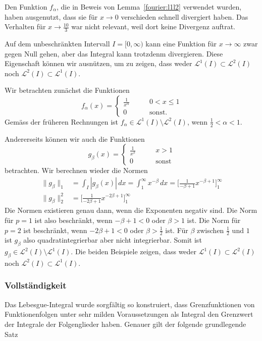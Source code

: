 \begin{beispiel}
Den Funktion $f_\alpha$, die in Beweis von Lemma~\ref{fourier:l1l2}
verwendet wurden, haben ausgenutzt, dass sie für $x\to 0$ verschieden 
schnell divergiert haben.
Das Verhalten für $x\to \frac{10}3$ war nicht relevant, weil dort keine
Divergenz auftrat.

Auf dem unbeschränkten Intervall $I=[0,\infty)$ kann eine Funktion 
für $x\to\infty$ zwar gegen Null gehen, aber das Integral kann trotzdenm
divergieren.
Diese Eigenschaft können wir ausnützen, um zu zeigen, dass weder
$\mathcal{L}^1(I)\subset\mathcal{L}^2(I)$
noch
$\mathcal{L}^2(I)\subset\mathcal{L}^1(I)$.

Wir betrachten zunächst die Funktionen
\[
f_\alpha(x) = \begin{cases}
\displaystyle\frac1{x^\alpha}&\qquad0<x\le 1\\
0&\qquad\text{sonst.}
\end{cases}
\]
Gemäss der früheren Rechnungen ist
$f_\alpha\in\mathcal{L}^1(I)\setminus\mathcal{L}^2(I)$,
wenn $\frac12<\alpha<1$.

Andererseits können wir auch die Funktionen
\[
g_\beta(x)
=
\begin{cases}
\displaystyle\frac1{x^\beta}&\qquad x>1\\
0&\qquad\text{sonst}
\end{cases}
\]
betrachten.
Wir berechnen wieder die Normen
\begin{align*}
\| g_\beta\|_1
&=
\int_I|g_\beta(x)|\,dx
=
\int_1^\infty x^{-\beta}\,dx
=
\biggl[
\frac1{-\beta+1}x^{-\beta+1}
\biggr]_1^\infty
\\
\|g_\beta\|_2^2
&=
\biggl[
\frac1{-2\beta+1}x^{-2\beta+1}
\biggr]_1^\infty
\end{align*}
Die Normen existieren genau dann, wenn die Exponenten negativ sind.
Die Norm für $p=1$ ist also beschränkt, wenn $-\beta+1<0$ oder $\beta > 1$
ist.
Die Norm für $p=2$ ist beschränkt, wenn $-2\beta+1<0$ oder $\beta > \frac12$
ist.
Für $\beta$ zwischen $\frac12$ und $1$ ist $g_\beta$ also quadratintegrierbar
aber nicht integrierbar.
Somit ist $g_\beta\in\mathcal{L}^2(I)\setminus\mathcal{L}^1(I)$.
Die beiden Beispiele zeigen, dass weder
$\mathcal{L}^1(I)\subset\mathcal{L}^2(I)$
noch
$\mathcal{L}^2(I)\subset\mathcal{L}^1(I)$.
\end{beispiel}

\subsubsection{Vollständigkeit}
Das Lebesgue-Integral wurde sorgfältig so konstruiert, dass Grenzfunktionen
von Funktionenfolgen unter sehr milden Voraussetzungen als Integral den
Grenzwert der Integrale der Folgenglieder haben.
Genauer gilt der folgende grundlegende Satz

